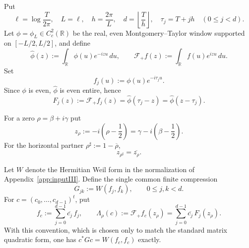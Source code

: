 \documentclass[11pt]{article}
\newcommand{\R}{\mathbb R}
\begin{document}
Put
\[
 \ell=\log\frac{T}{2\pi},\quad L=\ell,\quad
 h=\frac{2\pi}{L},\quad
 d=\left\lfloor\frac{T}{h}\right\rfloor,\quad
 \tau_j=T+jh\quad(0\le j<d).
\]
Let $\phi=\phi_L\in C_c^2(\R)$ be the real, even Montgomery--Taylor window
supported on $[-L/2,L/2]$, and define
\[
 \widehat\phi(z):=\int_{\R}\phi(u)e^{-izu}\,du,\qquad
 \mathcal F_+f(z):=\int_{\R}f(u)e^{izu}\,du.
\]
Set
\begin{equation}\label{eq:test-family}
 f_j(u):=\phi(u)e^{-i\tau_j u}.
\end{equation}
Since $\phi$ is even, $\widehat\phi$ is even entire, hence
\begin{equation}\label{eq:test-transform}
 F_j(z):=\mathcal F_+f_j(z)
 =\widehat\phi(\tau_j-z)
 =\widehat\phi(z-\tau_j).
\end{equation}

For a zero $\rho=\beta+i\gamma$ put
\begin{equation}\label{eq:zero-coordinate}
 z_\rho:=-i\left(\rho-\frac12\right)
 =\gamma-i\left(\beta-\frac12\right).
\end{equation}
For the horizontal partner $\rho^\sharp:=1-\overline\rho$,
\begin{equation}\label{eq:partner-coordinate}
 z_{\rho^\sharp}=\overline{z_\rho}.
\end{equation}

Let $W$ denote the Hermitian Weil form in the normalization of
Appendix~\ref{app:inputIII}.  Define the single common finite compression
\begin{equation}\label{eq:G-common}
 G_{jk}:=W(f_j,f_k),\qquad 0\le j,k<d.
\end{equation}
For $c=(c_0,\ldots,c_{d-1})^t$, put
\[
 f_c:=\sum_{j=0}^{d-1}\overline{c_j}\,f_j,\qquad
 \Lambda_\rho(c):=\mathcal F_+f_c(z_\rho)
 =\sum_{j=0}^{d-1}\overline{c_j}\,F_j(z_\rho).
\]
With this convention, which is chosen only to match the standard matrix
quadratic form, one has $c^*Gc=W(f_c,f_c)$ exactly.
\end{document}
